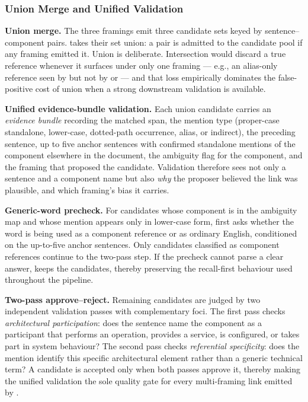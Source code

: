 \subsubsection{Union Merge and Unified Validation}\label{sec:unified}

\textbf{Union merge.}
The three framings emit three candidate sets keyed by
sentence--component pairs.
\approach takes their set union: a pair is admitted to the
candidate pool if any framing emitted it.
Union is deliberate.
Intersection would discard a true reference whenever it surfaces
under only one framing --- e.g., an alias-only reference seen by
\linkerC but not by \linkerA or \linkerB --- and that loss
empirically dominates the false-positive cost of union when a
strong downstream validation is available.

\textbf{Unified evidence-bundle validation.}
Each union candidate carries an \emph{evidence bundle} recording
the matched span, the mention type (proper-case standalone,
lower-case, dotted-path occurrence, alias, or indirect), the
preceding sentence, up to five anchor sentences with confirmed
standalone mentions of the component elsewhere in the document,
the ambiguity flag for the component, and the framing that
proposed the candidate.
Validation therefore sees not only a sentence and a component name
but also \emph{why} the proposer believed the link was plausible,
and which framing's bias it carries.

\textbf{Generic-word precheck.}
For candidates whose component is in the ambiguity map and whose
mention appears only in lower-case form, \approach first asks
whether the word is being used as a component reference or as
ordinary English, conditioned on the up-to-five anchor sentences.
Only candidates classified as component references continue to the
two-pass step.
If the precheck cannot parse a clear answer, \approach keeps the
candidates, thereby preserving the recall-first behaviour used
throughout the pipeline.

\textbf{Two-pass approve--reject.}
Remaining candidates are judged by two independent validation
passes with complementary foci.
The first pass checks \emph{architectural participation}: does the
sentence name the component as a participant that performs an
operation, provides a service, is configured, or takes part in
system behaviour?
The second pass checks \emph{referential specificity}: does the
mention identify this specific architectural element rather than a
generic technical term?
A candidate is accepted only when both passes approve it, thereby
making the unified validation the sole quality gate for every
multi-framing link emitted by \approach.

